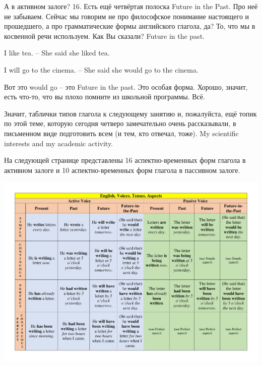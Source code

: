\documentclass[main.tex]{subfiles}
\begin{document}
А в активном залоге? 16.
Есть ещё четвёртая полоска Future in the Past.
Про неё не забываем.
Сейчас мы говорим не про философское понимание настоящего и прошедшего, а про грамматические формы английского глагола, да?
То, что мы в косвенной речи используем.
Как Вы сказали?
Future in the past.

I like tea. -- She said she liked tea.

I will go to the cinema. -- She said she would go to the cinema.

Вот это would go -- это Future in the past.
Это особая форма.
Хорошо, значит, есть что-то, что вы плохо помните из школьной программы.
Всё.

Значит, таблички типов глагола к следующему занятию и, пожалуйста, ещё топик по этой теме, которую сегодня четверо замечательно очень рассказывали, в письменном виде подготовить всем (и тем, кто отвечал, тоже).
My scientific interests and my academic activity.


На следующей странице представлены 16 аспектно-временных форм глагола в активном залоге и 10 аспектно-временных форм глагола в пассивном залоге.\newpage

{\parindent0pt\includegraphics[angle=90,width=\textwidth,page=1,trim={0.5in 0.2in 0.49in 0.2in},clip=true]{EnglishTensesAspectsVoicesPoster.pdf}}
\end{document}
